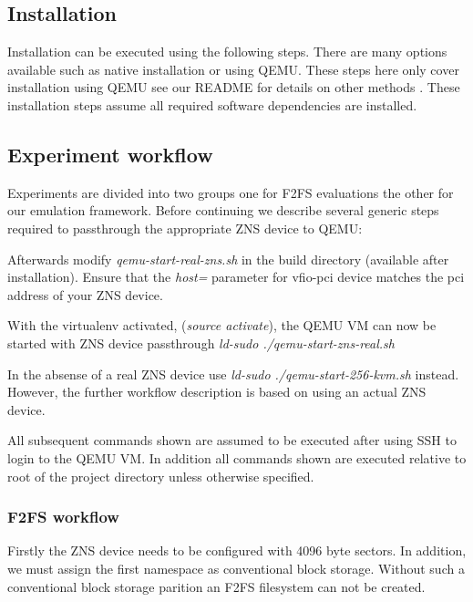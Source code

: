\subsection{Installation}

Installation can be executed using the following steps. There are many options
available such as native installation or using QEMU. These steps here only
cover installation using QEMU see our README for details on other methods
\cite{qemu-csd}. These installation steps assume all required software
dependencies are installed.


\subsection{Experiment workflow}

Experiments are divided into two groups one for F2FS evaluations the other for
our emulation framework. Before continuing we describe several generic steps
required to passthrough the appropriate ZNS device to QEMU:


Afterwards modify \textit{qemu-start-real-zns.sh} in the build directory
(available after installation). Ensure that the \textit{host=} parameter for
vfio-pci device matches the pci address of your ZNS device.

With the virtualenv activated, (\textit{source activate}), the QEMU VM can now
be started with ZNS device passthrough \textit{ld-sudo ./qemu-start-zns-real.sh}

In the absense of a real ZNS device use \textit{ld-sudo ./qemu-start-256-kvm.sh}
instead. However, the further workflow description is based on using an actual
ZNS device.

All subsequent commands shown are assumed to be executed after using SSH to
login to the QEMU VM. In addition all commands shown are executed relative
to root of the project directory unless otherwise specified.

\subsubsection{F2FS workflow}

Firstly the ZNS device needs to be configured with 4096 byte sectors. In
addition, we must assign the first namespace as conventional block storage.
Without such a conventional block storage parition an F2FS filesystem can not
be created.

